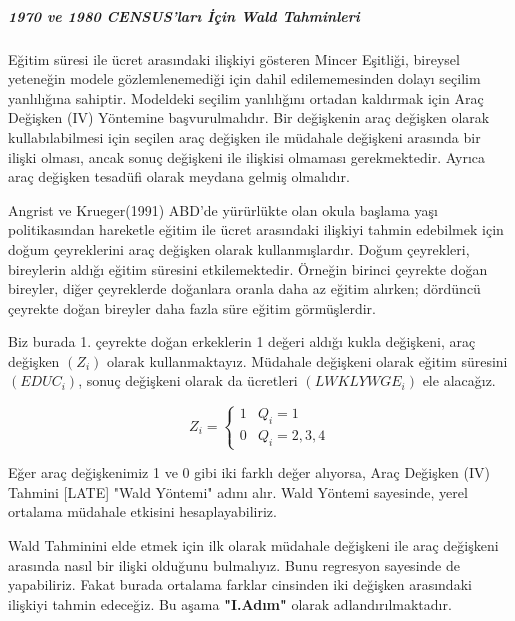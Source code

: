 \documentclass[12pt, a4paper, showtrims]{article}
\begin{document}
\begin{justify}
\begin{table}[h!]
    \label{Tablo:1}
\end{table}

\subparagraph{1970 ve 1980 CENSUS'ları İçin Wald Tahminleri} 
\setlength{\parindent}{0em}    
\begin{justify}
\setlength{\parindent}{0em}     
  
    
    Eğitim süresi ile ücret arasındaki ilişkiyi gösteren Mincer Eşitliği, bireysel yeteneğin
    modele gözlemlenemediği için dahil edilememesinden dolayı seçilim yanlılığına sahiptir.
    Modeldeki seçilim yanlılığını ortadan kaldırmak için Araç Değişken (IV) Yöntemine başvurulmalıdır.
    Bir değişkenin araç değişken olarak kullabılabilmesi için seçilen araç değişken ile müdahale değişkeni
    arasında bir ilişki olması, ancak sonuç değişkeni ile ilişkisi olmaması gerekmektedir. 
    Ayrıca araç değişken tesadüfi olarak meydana gelmiş olmalıdır. \par 
    
    \newpage
    Angrist ve Krueger(1991) ABD'de yürürlükte olan okula başlama yaşı politikasından
    hareketle eğitim ile ücret arasındaki ilişkiyi tahmin edebilmek için doğum çeyreklerini 
    araç değişken olarak kullanmışlardır. Doğum çeyrekleri, bireylerin aldığı eğitim süresini
    etkilemektedir. Örneğin birinci çeyrekte doğan bireyler, diğer çeyreklerde doğanlara oranla
    daha az eğitim alırken; dördüncü çeyrekte doğan bireyler daha fazla süre eğitim görmüşlerdir.
    
    Biz burada 1. çeyrekte doğan erkeklerin 1 değeri aldığı kukla değişkeni, araç değişken $(Z_i)$ olarak
    kullanmaktayız. Müdahale değişkeni olarak eğitim süresini $(EDUC_i)$, sonuç değişkeni olarak da ücretleri 
    $(LWKLYWGE_i)$ ele alacağız.

    \[Z_i=  \begin{cases} 
        1 & Q_{i}= 1 \\
        0 & Q_{i}= 2,3,4 
     \end{cases}\]

    Eğer araç değişkenimiz 1 ve 0 gibi iki farklı değer alıyorsa, Araç Değişken (IV) Tahmini [LATE]
    "Wald Yöntemi" adını alır. Wald Yöntemi sayesinde, yerel ortalama müdahale etkisini hesaplayabiliriz.
    
    Wald Tahminini elde etmek için ilk olarak müdahale değişkeni ile araç değişkeni
    arasında nasıl bir ilişki olduğunu bulmalıyız. Bunu regresyon sayesinde de yapabiliriz. 
    Fakat burada ortalama farklar cinsinden iki değişken arasındaki ilişkiyi tahmin edeceğiz.
    Bu aşama \textbf{"I.Adım"} olarak adlandırılmaktadır.


\end{justify}
\end{justify}
\end{document}

